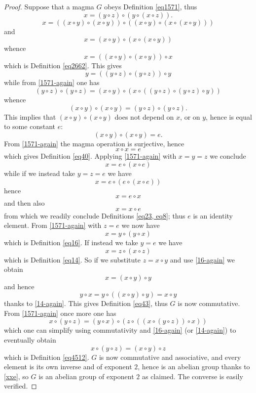 \begin{proof}\leanok  Suppose that a magma $G$ obeys Definition \ref{eq1571}, thus
\begin{equation}\label{1571-again}
 x = (y \circ z) \circ (y \circ (x \circ z)).
\end{equation}
$$ x = ((x \circ y) \circ (x \circ y)) \circ ((x \circ y) \circ (x \circ (x \circ y)))$$
and
$$ x = (x \circ y) \circ (x \circ (x \circ y))$$
whence
$$x = ((x \circ y) \circ (x \circ y)) \circ x$$
which is Definition \ref{eq2662}.  This gives
$$y = ((y \circ z) \circ (y \circ z)) \circ y$$
while from \eqref{1571-again} one has
$$ (y \circ z) \circ (y \circ z) = (x \circ y) \circ (x \circ ((y \circ z) \circ (y \circ z) \circ y))$$
whence
$$ (x \circ y) \circ (x \circ y) = (y \circ z) \circ (y \circ z).$$
This implies that $(x \circ y) \circ (x \circ y)$ does not depend on $x$, or on $y$, hence is equal to some constant $e$:
$$ (x \circ y) \circ (x \circ y) = e.$$
From \eqref{1571-again} the magma operation is surjective, hence
\begin{equation}\label{xxe} x \circ x = e
\end{equation}
which gives Definition \ref{eq40}.  Applying \eqref{1571-again} with $x=y=z$ we conclude
$$ x = e \circ (x \circ e)$$
while if we instead take $y=z=e$ we have
$$ x = e \circ (e \circ (x \circ e))$$
hence
$$ x = e \circ x$$
and then also
$$ x = x \circ e$$
from which we readily conclude Definitions \ref{eq23, eq8}; thus $e$ is an identity element.  From \eqref{1571-again} with $z=e$ we now have
\begin{equation}\label{16-again}
 x = y \circ (y \circ x)
\end{equation}
which is Definition \ref{eq16}. If instead we take $y=e$ we have
\begin{equation}\label{14-again}
  x = z \circ (x \circ z)
\end{equation}
which is Definition \ref{eq14}.  So if we substitute $z = x \circ y$ and use \eqref{16-again} we obtain
$$ x = (x \circ y) \circ y$$
and hence
$$ y \circ x = y \circ ((x \circ y) \circ y) = x \circ y$$
thanks to \eqref{14-again}.  This gives Definition \ref{eq43}, thus $G$ is now commutative.  From \eqref{1571-again} once more one has
$$x \circ (y \circ z) = (y \circ x) \circ (z \circ ((x \circ (y \circ z)) \circ x))$$
which one can simplify using commutativity and \eqref{16-again} (or \eqref{14-again}) to eventually obtain
$$x \circ (y \circ z) = (x \circ y) \circ z$$
which is Definition \ref{eq4512}.  $G$ is now commutative and associative, and every element is its own inverse and of exponent $2$, hence is an abelian group thanks to \eqref{xxe}, so $G$ is an abelian group of exponent $2$ as claimed.  The converse is easily verified.
\end{proof}
